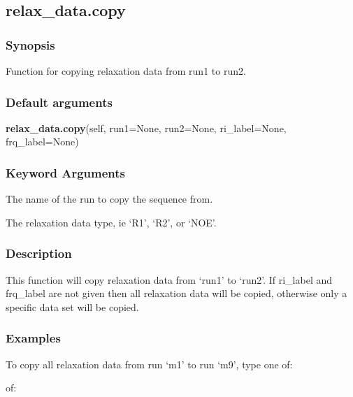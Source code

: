 \subsection{relax\_data.copy}


\subsubsection{Synopsis}

Function for copying relaxation data from run1 to run2.

\subsubsection{Default arguments}

\textsf{\textbf{relax\_data.copy}(self, run1=None, run2=None, ri\_label=None, frq\_label=None)}


\subsubsection{Keyword Arguments}

  The name of the run to copy the sequence from.

  The relaxation data type, ie `R1', `R2', or `NOE'.


\subsubsection{Description}

This function will copy relaxation data from `run1' to `run2'.  If ri\_label and frq\_label
are not given then all relaxation data will be copied, otherwise only a specific data set
will be copied.


\subsubsection{Examples}

To copy all relaxation data from run `m1' to run `m9', type one of:



of:




\newpage

